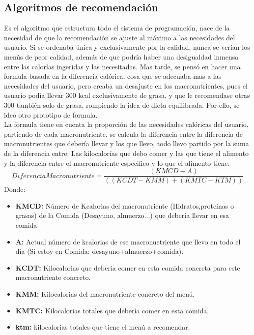 \subsection{Algoritmos de recomendación}
Es el algoritmo que estructura todo el sistema de programación, nace de la necesidad de que la recomendación se ajuste al máximo a las necesidades del usuario. Si se ordenaba única y exclusivamente por la calidad, nunca se verían los menús de peor calidad, además de que podría haber una desigualdad inmensa entre las calorías ingeridas y las necesitadas. Mas tarde, se pensó en hacer una formula basada en la diferencia calórica, cosa que se adecuaba mas a las necesidades del usuario, pero creaba un desajuste en los macronutrientes, pues el usuario podía llevar 300 kcal exclusivamente de grasa, y que le recomendase otras 300 también solo de grasa, rompiendo la idea de dieta equilibrada. Por ello, se ideo otro prototipo de formula.\\

La formula tiene en cuenta la proporción de las necesidades calóricas del usuario, partiendo de cada macronutriente, se calcula la diferencia entre la diferencia de macronutrientes que debería llevar y los que llevo, todo llevo partido por la suma de la diferencia entre: Las kilocalorías que debo comer y las que tiene el alimento y la diferencia entre el macronutriente especifico y lo que el alimento tiene.\\
\begin{equation}
DiferenciaMacronutriente = \frac{(KMCD - A)}{((KCDT-KMM)+(KMTC-KTM))}
\end{equation}
Donde:
\begin{itemize}
\item \textbf{KMCD:} Número de Kcalorias del macronutriente (Hidratos,proteinas o grasas) de la Comida (Desayuno, almuerzo...) que debería llevar en esa comida
\item \textbf{A:} Actual número de kcalorias de ese macronuetriente que llevo en todo el día (Si estoy en Comida: desayuno+almuerzo+comida).
\item \textbf{KCDT:} Kilocalorias que debería comer en esta comida concreta para este macronutriente concreto.
\item \textbf{KMM:} Kilocalorias del macronutriente concreto del menú.
\item \textbf{KMTC:} Kilocalorias totales que debería comer en esta comida.
\item \textbf{ktm:} kilocalorias totales que tiene el menú a recomendar.

\end{itemize}
